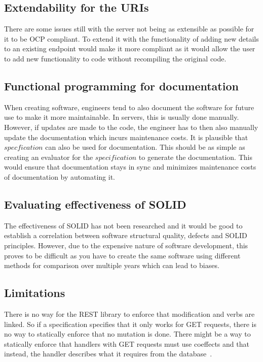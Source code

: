 \subsection{Extendability for the URIs}

There are some issues still with the server not being as extensible as possible
for it to be OCP compliant. To extend it with the functionality of adding new
details to an existing endpoint would make it more compliant as it would allow
the user to add new functionality to code without recompiling the original
code. 

\subsection{Functional programming for documentation}

When creating software, engineers tend to also document the software for future
use to make it more maintainable. In servers, this is usually done manually.
However, if updates are made to the code, the engineer has to then also
manually update the documentation which incurs maintenance costs. It is
plausible that $specfication$ can also be used for documentation. This should
be as simple as creating an evaluator for the $specification$ to generate the
documentation. This would ensure that documentation stays in sync and minimizes
maintenance costs of documentation by automating it.

\subsection{Evaluating effectiveness of SOLID}

The effectiveness of SOLID has not been researched and it would be good to
establish a correlation between software structural quality, defects and SOLID
principles. However, due to the expensive nature of software development, this
proves to be difficult as you have to create the same software using different
methods for comparison over multiple years which can lead to biases.

\subsection{Limitations}

There is no way for the REST library to enforce that modification and verbs are
linked. So if a specification specifies that it only works for GET requests,
there is no way to statically enforce that no mutation is done. There might be a
way to statically enforce that handlers with GET requests must use coeffects and
that instead, the handler describes what it requires from the
database~\cite{gaboardi2016combining}.


